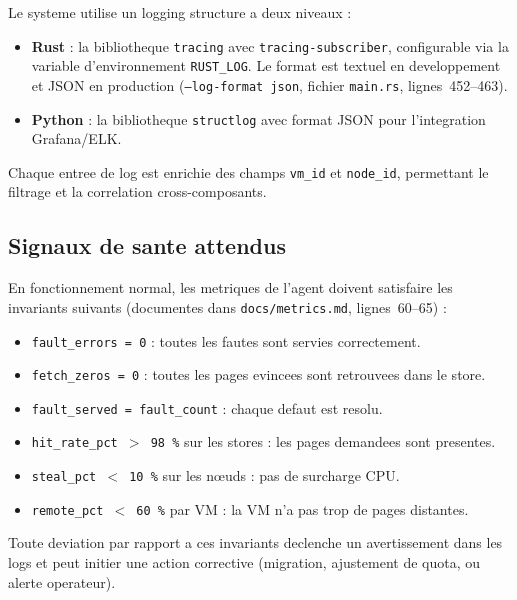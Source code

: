 Le systeme utilise un logging structure a deux niveaux :

\begin{itemize}
    \item \textbf{Rust} : la bibliotheque \texttt{tracing} avec \texttt{tracing-subscriber}, configurable via la variable d'environnement \texttt{RUST\_LOG}. Le format est textuel en developpement et JSON en production (\texttt{--log-format json}, fichier \texttt{main.rs}, lignes~452--463).
    \item \textbf{Python} : la bibliotheque \texttt{structlog} avec format JSON pour l'integration Grafana/ELK.
\end{itemize}

Chaque entree de log est enrichie des champs \texttt{vm\_id} et \texttt{node\_id}, permettant le filtrage et la correlation cross-composants.

\subsection{Signaux de sante attendus}
\label{subsec:signaux-sante}

En fonctionnement normal, les metriques de l'agent doivent satisfaire les invariants suivants (documentes dans \texttt{docs/metrics.md}, lignes~60--65) :

\begin{itemize}
    \item \texttt{fault\_errors = 0} : toutes les fautes sont servies correctement.
    \item \texttt{fetch\_zeros = 0} : toutes les pages evincees sont retrouvees dans le store.
    \item \texttt{fault\_served = fault\_count} : chaque defaut est resolu.
    \item \texttt{hit\_rate\_pct $>$ 98\,\%} sur les stores : les pages demandees sont presentes.
    \item \texttt{steal\_pct $<$ 10\,\%} sur les n\oe{}uds : pas de surcharge CPU.
    \item \texttt{remote\_pct $<$ 60\,\%} par VM : la VM n'a pas trop de pages distantes.
\end{itemize}

Toute deviation par rapport a ces invariants declenche un avertissement dans les logs et peut initier une action corrective (migration, ajustement de quota, ou alerte operateur).

